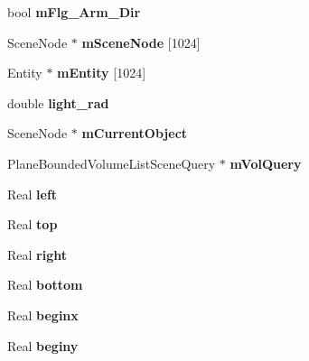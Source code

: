 \begin{DoxyCompactItemize}
bool {\bfseries m\+Flg\+\_\+\+Arm\+\_\+\+Dir}
\item 
\mbox{\label{class_basic_tutorial__00_a4ce11b746634fb2edeb80c145d91d842}} 
Scene\+Node $\ast$ {\bfseries m\+Scene\+Node} \mbox{[}1024\mbox{]}
\item 
\mbox{\label{class_basic_tutorial__00_a4457f00e95bd513d333a9abe6a0e8291}} 
Entity $\ast$ {\bfseries m\+Entity} \mbox{[}1024\mbox{]}
\item 
\mbox{\label{class_basic_tutorial__00_a1458072796de68b7a470066f6e5a386d}} 
double {\bfseries light\+\_\+rad}
\item 
\mbox{\label{class_basic_tutorial__00_af30f70851fcf2cba7745c390d7fad024}} 
Scene\+Node $\ast$ {\bfseries m\+Current\+Object}
\item 
\mbox{\label{class_basic_tutorial__00_a27d3fe84e77db4856f10c5974e2f6bc6}} 
Plane\+Bounded\+Volume\+List\+Scene\+Query $\ast$ {\bfseries m\+Vol\+Query}
\item 
\mbox{\label{class_basic_tutorial__00_a8ada85db081fcbd05c97a45cfe18a6aa}} 
Real {\bfseries left}
\item 
\mbox{\label{class_basic_tutorial__00_a61e0a0ebbf5a9e840e7361f3b161fbc1}} 
Real {\bfseries top}
\item 
\mbox{\label{class_basic_tutorial__00_a166e8915a0f9e89d543cbac55c0a7713}} 
Real {\bfseries right}
\item 
\mbox{\label{class_basic_tutorial__00_a24c00dd93893a2fe627f186e1fc1ded8}} 
Real {\bfseries bottom}
\item 
\mbox{\label{class_basic_tutorial__00_a7127f4ee9c4be53e14a3abf9c6d4aea6}} 
Real {\bfseries beginx}
\item 
\mbox{\label{class_basic_tutorial__00_af954650b8e161fce5d2298cf8950f156}} 
Real {\bfseries beginy}

\end{DoxyCompactItemize}
